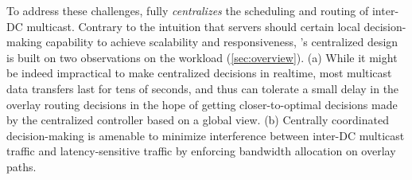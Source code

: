 %

To address these challenges, \name fully {\em centralizes}
the scheduling and routing of inter-DC multicast.
Contrary to the intuition that servers should certain
local decision-making capability to achieve scalability and
responsiveness, \name's centralized design
is built on two observations on the workload
(\Section\ref{sec:overview}).
(a) While it might be indeed impractical to make
centralized decisions in realtime, most multicast data transfers
last for tens of seconds, and thus 
can tolerate a small delay in the overlay routing decisions
in the hope of getting closer-to-optimal decisions made by
the centralized controller based on a global view.
(b) Centrally coordinated decision-making is amenable
to minimize interference between inter-DC multicast
traffic and latency-sensitive traffic by enforcing 
bandwidth allocation on overlay paths.

